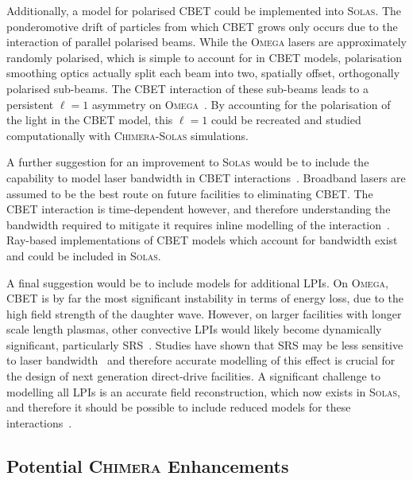 Additionally, a model for polarised \ac{CBET} could be implemented into \textsc{Solas}.
The ponderomotive drift of particles from which \ac{CBET} grows only occurs due to the interaction of parallel polarised beams.
While the \textsc{Omega} lasers are approximately randomly polarised, which is simple to account for in \ac{CBET} models, polarisation smoothing optics actually split each beam into two, spatially offset, orthogonally polarised sub-beams.
The \ac{CBET} interaction of these sub-beams leads to a persistent $\ell=1$ asymmetry on \textsc{Omega}~\cite{mannion_mitigation_2021,edgell_nonuniform_2021,colaitis_3d_2022}.
By accounting for the polarisation of the light in the \ac{CBET} model, this $\ell=1$ could be recreated and studied computationally with \textsc{Chimera}-\textsc{Solas} simulations.

A further suggestion for an improvement to \textsc{Solas} would be to include the capability to model laser bandwidth in \ac{CBET} interactions~\cite{follett_raybased_2023}.
Broadband lasers are assumed to be the best route on future facilities to eliminating \ac{CBET}.
The \ac{CBET} interaction is time-dependent however, and therefore understanding the bandwidth required to mitigate it requires inline modelling of the interaction~\cite{colaitis_exploration_2023}.
Ray-based implementations of \ac{CBET} models which account for bandwidth exist and could be included in \textsc{Solas}.

A final suggestion would be to include models for additional \ac{LPIs}.
On \textsc{Omega}, \ac{CBET} is by far the most significant instability in terms of energy loss, due to the high field strength of the daughter wave.
However, on larger facilities with longer scale length plasmas, other convective \ac{LPIs} would likely become dynamically significant, particularly \ac{SRS}~\cite{scott_shock_2021}.
Studies have shown that \ac{SRS} may be less sensitive to laser bandwidth~\cite{zhao_mitigation_2022} and therefore accurate modelling of this effect is crucial for the design of next generation direct-drive facilities.
A significant challenge to modelling all \ac{LPIs} is an accurate field reconstruction, which now exists in \textsc{Solas}, and therefore it should be possible to include reduced models for these interactions~\cite{debayle_unified_2019}.

\subsection{Potential \textsc{Chimera} Enhancements}

